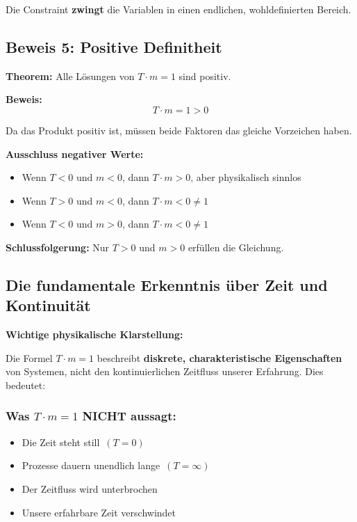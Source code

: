 \documentclass[12pt,a4paper]{article}
\theoremstyle{definition}
\theoremstyle{remark}
\begin{document}
Die Constraint \textbf{zwingt} die Variablen in einen endlichen, wohldefinierten Bereich.

\subsection{Beweis 5: Positive Definitheit}

\textbf{Theorem:} Alle Lösungen von $T \cdot m = 1$ sind positiv.

\textbf{Beweis:}
\begin{equation}
	T \cdot m = 1 > 0
\end{equation}

Da das Produkt positiv ist, müssen beide Faktoren das gleiche Vorzeichen haben.

\textbf{Ausschluss negativer Werte:}
\begin{itemize}
	\item Wenn $T < 0$ und $m < 0$, dann $T \cdot m > 0$, aber physikalisch sinnlos
	\item Wenn $T > 0$ und $m < 0$, dann $T \cdot m < 0 \neq 1$
	\item Wenn $T < 0$ und $m > 0$, dann $T \cdot m < 0 \neq 1$
\end{itemize}

\textbf{Schlussfolgerung:} Nur $T > 0$ und $m > 0$ erfüllen die Gleichung.

\subsection{Die fundamentale Erkenntnis über Zeit und Kontinuität}

\textbf{Wichtige physikalische Klarstellung:}

Die Formel $T \cdot m = 1$ beschreibt \textbf{diskrete, charakteristische Eigenschaften} von Systemen, nicht den kontinuierlichen Zeitfluss unserer Erfahrung. Dies bedeutet:

\subsubsection{Was $T \cdot m = 1$ NICHT aussagt:}
\begin{itemize}
	\item \glqq Die Zeit steht still\grqq\ $(T = 0)$
	\item \glqq Prozesse dauern unendlich lange\grqq\ $(T = \infty)$
	\item \glqq Der Zeitfluss wird unterbrochen\grqq
	\item \glqq Unsere erfahrbare Zeit verschwindet\grqq
\end{itemize}
\end{document}
